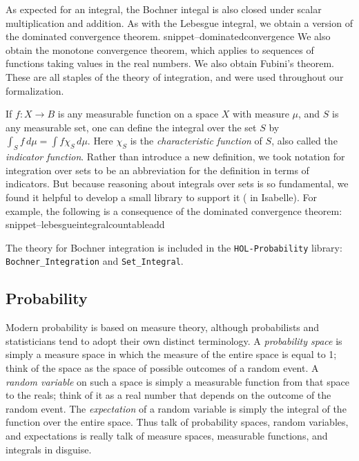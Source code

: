 \documentclass{svjour3}
\newcommand{\Snippet}[1]{\csname snippet--#1\endcsname}
\begin{document}
As expected for an integral, the Bochner integal is also closed under scalar multiplication and addition. As with the Lebesgue integral, we obtain a version of the dominated convergence theorem.
\Snippet{dominatedconvergence}
We also obtain the monotone convergence theorem, which applies to sequences of functions taking values in the real numbers. We also obtain Fubini's theorem. These are all staples of the theory of integration, and were used throughout our formalization.

If $f : X \to B$ is any measurable function on a space $X$ with measure $\mu$, and $S$ is any measurable set, one can define the integral over the set $S$ by $\int_S f \, d\mu = \int f \chi_S \, d\mu$. Here $\chi_S$ is the \emph{characteristic function} of $S$, also called the \emph{indicator function}. Rather than introduce a new definition, we took notation for integration over sets to be an abbreviation for the definition in terms of indicators. But because reasoning about integrals over sets is so fundamental, we found it helpful to develop a small library to support it ( in Isabelle). For example, the following is a consequence of the dominated convergence theorem:
\Snippet{lebesgueintegralcountableadd}

The theory for Bochner integration is included in the \texttt{HOL-Probability} library: \verb=Bochner_Integration= and \verb=Set_Integral=.

\subsection{Probability}
\label{subsection:probability}

Modern probability is based on measure theory, although probabilists and statisticians tend to adopt their own distinct terminology. A \emph{probability space} is simply a measure space in which the measure of the entire space is equal to 1; think of the space as the space of possible outcomes of a random event. A \emph{random variable} on such a space is simply a measurable function from that space to the reals; think of it as a real number that depends on the outcome of the random event. The \emph{expectation} of a random variable is simply the integral of the function over the entire space. Thus talk of probability spaces, random variables, and expectations is really talk of measure spaces, measurable functions, and integrals in disguise.
\end{document}
